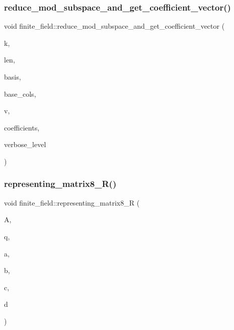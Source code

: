 \subsubsection{\texorpdfstring{reduce\+\_\+mod\+\_\+subspace\+\_\+and\+\_\+get\+\_\+coefficient\+\_\+vector()}{reduce\_mod\_subspace\_and\_get\_coefficient\_vector()}}
{\footnotesize\ttfamily void finite\+\_\+field\+::reduce\+\_\+mod\+\_\+subspace\+\_\+and\+\_\+get\+\_\+coefficient\+\_\+vector (\begin{DoxyParamCaption}\item[{\mbox{\hyperlink{galois_8h_a09fddde158a3a20bd2dcadb609de11dc}{I\+NT}}}]{k,  }\item[{\mbox{\hyperlink{galois_8h_a09fddde158a3a20bd2dcadb609de11dc}{I\+NT}}}]{len,  }\item[{\mbox{\hyperlink{galois_8h_a09fddde158a3a20bd2dcadb609de11dc}{I\+NT}} $\ast$}]{basis,  }\item[{\mbox{\hyperlink{galois_8h_a09fddde158a3a20bd2dcadb609de11dc}{I\+NT}} $\ast$}]{base\+\_\+cols,  }\item[{\mbox{\hyperlink{galois_8h_a09fddde158a3a20bd2dcadb609de11dc}{I\+NT}} $\ast$}]{v,  }\item[{\mbox{\hyperlink{galois_8h_a09fddde158a3a20bd2dcadb609de11dc}{I\+NT}} $\ast$}]{coefficients,  }\item[{\mbox{\hyperlink{galois_8h_a09fddde158a3a20bd2dcadb609de11dc}{I\+NT}}}]{verbose\+\_\+level }\end{DoxyParamCaption})}

\mbox{\label{classfinite__field_ac20b429a104a1516a46dd6eb2e0c207b}} 
\subsubsection{\texorpdfstring{representing\+\_\+matrix8\+\_\+\+R()}{representing\_matrix8\_R()}}
{\footnotesize\ttfamily void finite\+\_\+field\+::representing\+\_\+matrix8\+\_\+R (\begin{DoxyParamCaption}\item[{\mbox{\hyperlink{galois_8h_a09fddde158a3a20bd2dcadb609de11dc}{I\+NT}} $\ast$}]{A,  }\item[{\mbox{\hyperlink{galois_8h_a09fddde158a3a20bd2dcadb609de11dc}{I\+NT}}}]{q,  }\item[{\mbox{\hyperlink{galois_8h_a09fddde158a3a20bd2dcadb609de11dc}{I\+NT}}}]{a,  }\item[{\mbox{\hyperlink{galois_8h_a09fddde158a3a20bd2dcadb609de11dc}{I\+NT}}}]{b,  }\item[{\mbox{\hyperlink{galois_8h_a09fddde158a3a20bd2dcadb609de11dc}{I\+NT}}}]{c,  }\item[{\mbox{\hyperlink{galois_8h_a09fddde158a3a20bd2dcadb609de11dc}{I\+NT}}}]{d }\end{DoxyParamCaption})}

